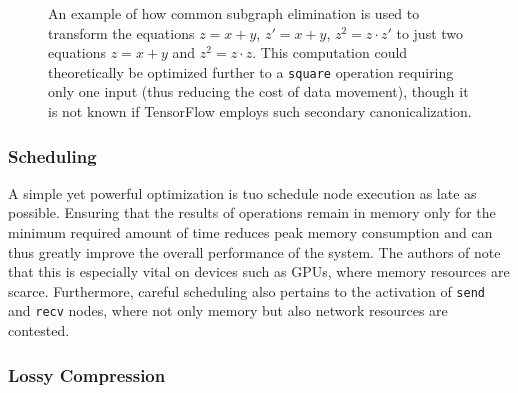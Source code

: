 \begin{figure}
\begin{subfigure}[h]{0.5\textwidth}
  \end{subfigure}
  \caption{An example of how common subgraph elimination is used to transform the
    equations $z = x + y$, $z' = x + y$, $z^2 = z \cdot z'$ to just two
    equations $z = x + y$ and $z^2 = z \cdot z$. This computation could
    theoretically be optimized further to a \texttt{square} operation requiring
    only one input (thus reducing the cost of data movement), though it is not
    known if TensorFlow employs such secondary canonicalization.}
  \label{fig:subgraph-elim}
\end{figure}

\subsubsection{Scheduling}\label{sec:model-optim-schedule}

A simple yet powerful optimization is tuo schedule node execution as late as
possible. Ensuring that the results of operations remain in memory only for the
minimum required amount of time reduces peak memory consumption and can thus
greatly improve the overall performance of the system. The authors of
\cite{tensorflow} note that this is especially vital on devices such as GPUs,
where memory resources are scarce. Furthermore, careful scheduling also pertains
to the activation of \texttt{send} and \texttt{recv} nodes, where not only
memory but also network resources are contested.

\subsubsection{Lossy Compression}\label{sec:model-optim-lossy}


